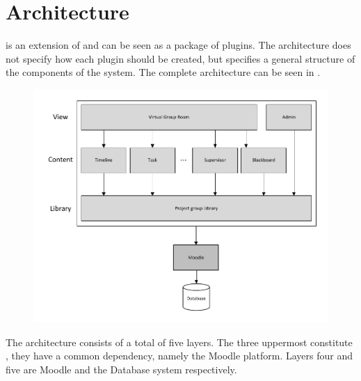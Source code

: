 \section{Architecture}
\label{sec:architecture}
\system{} is an extension of \moodle{} and can be seen as a package of plugins. 
The architecture does not specify how each plugin should be created, but specifies a general structure of the components of the system. 
The complete architecture can be seen in .
\begin{figure}[h!t]
	\centering
		\includegraphics[width=\textwidth]{images/architecture.pdf}
	\label{fig:architecture}
\end{figure}

The architecture consists of a total of five layers. 
The three uppermost constitute \system{}, they have a common dependency, namely the Moodle platform. 
Layers four and five are Moodle and the Database system respectively.

